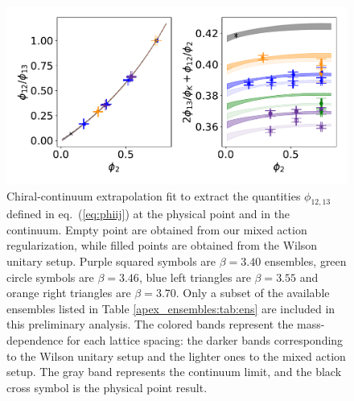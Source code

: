 \begin{figure}
  	\centering
  	\includegraphics[scale=.5]{./apendices/figs_appex/mR_ratios_comb.pdf}
  	\caption{Chiral-continuum extrapolation fit to extract the quantities $\phi_{12,13}$ defined in eq.~(\ref{eq:phiij}) at the physical point and in the continuum. Empty point are obtained from our mixed action regularization, while filled points are obtained from the Wilson unitary setup. Purple squared symbols are $\beta=3.40$ ensembles, green circle symbols are $\beta=3.46$, blue left triangles are $\beta=3.55$ and orange right triangles are $\beta=3.70$. Only a subset of the available ensembles listed in Table \ref{apex_ensembles:tab:ens} are included in this preliminary analysis. The colored bands represent the mass-dependence for each lattice spacing: the darker bands corresponding to the Wilson unitary setup and the lighter ones to the mixed action setup. The gray band represents the continuum limit, and the black cross symbol is the physical point result.} 
\label{fig:qm} 
\end{figure}



